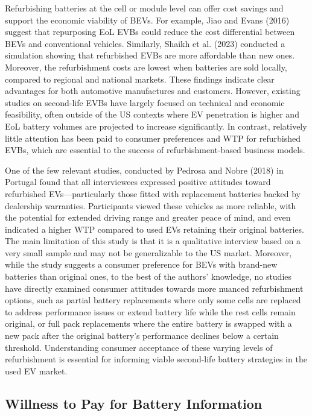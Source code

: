 \documentclass[a4paper,fleqn]{cas-sc}   %
\begin{document}
Refurbishing batteries at the cell or module level can offer cost savings and support the economic viability of BEVs. For example, Jiao and Evans (2016) suggest that repurposing EoL EVBs could reduce the cost differential between BEVs and conventional vehicles. Similarly, Shaikh et al. (2023) conducted a simulation showing that refurbished EVBs are more affordable than new ones. Moreover, the refurbishment costs are lowest when batteries are sold locally, compared to regional and national markets. These findings indicate clear advantages for both automotive manufactures and customers. However, existing studies on second-life EVBs have largely focused on technical and economic feasibility, often outside of the US contexts where EV penetration is higher and EoL battery volumes are projected to increase significantly. In contrast, relatively little attention has been paid to consumer preferences and WTP for refurbished EVBs, which are essential to the success of refurbishment-based business models.

One of the few relevant studies, conducted by Pedrosa and Nobre (2018) in Portugal found that all interviewees expressed positive attitudes toward refurbished EVs—particularly those fitted with replacement batteries backed by dealership warranties. Participants viewed these vehicles as more reliable, with the potential for extended driving range and greater peace of mind, and even indicated a higher WTP compared to used EVs retaining their original batteries. The main limitation of this study is that it is a qualitative interview based on a very small sample and may not be generalizable to the US market. Moreover, while the study suggests a consumer preference for BEVs with brand-new batteries than original ones, to the best of the authors' knowledge, no studies have directly examined consumer attitudes towards more nuanced refurbishment options, such as partial battery replacements where only some cells are replaced to address performance issues or extend battery life while the rest cells remain original, or full pack replacements where  the entire battery is swapped with a new pack after the original battery's performance declines below a certain threshold. Understanding consumer acceptance of these varying levels of refurbishment is essential for informing viable second-life battery strategies in the used EV market.

\subsection{Willness to Pay for Battery Information}
\end{document}
